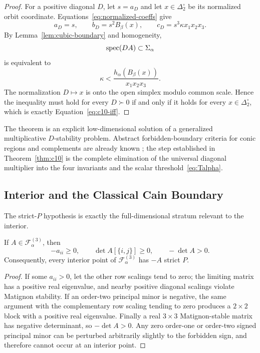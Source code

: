 \begin{proof}
For a positive diagonal \(D\), let \(s=a_D\) and let \(x\in\Delta_2^\circ\) be its normalized orbit coordinate. Equations~\eqref{eq:normalized-coeffs} give
\[
a_D=s,\qquad
b_D=s^2B_\beta(x),\qquad
c_D=s^3\kappa x_1x_2x_3.
\]
By Lemma~\ref{lem:cubic-boundary} and homogeneity,
\[
\operatorname{spec}(DA)\subset\Sigma_\alpha
\]
is equivalent to
\[
\kappa
<
\frac{h_\alpha(B_\beta(x))}{x_1x_2x_3}.
\]
The normalization \(D\mapsto x\) is onto the open simplex modulo common scale. Hence the inequality must hold for every \(D\succ0\) if and only if it holds for every \(x\in\Delta_2^\circ\), which is exactly Equation~\eqref{eq:c10-iff}.
\end{proof}

The theorem is an explicit low-dimensional solution of a generalized multiplicative \(D\)-stability problem. Abstract forbidden-boundary criteria for conic regions and complements are already known \cite{KushelPavaniJDDE}; the step established in Theorem~\ref{thm:c10} is the complete elimination of the universal diagonal multiplier into the four invariants and the scalar threshold~\eqref{eq:Talpha}.

\subsection{Interior and the Classical Cain Boundary}

The strict-\(P\) hypothesis is exactly the full-dimensional stratum relevant to the interior.

\begin{Lemma}\label{lem:P0}
If \(A\in\mathcal F_\alpha^{(3)}\), then
\[
-a_{ii}\ge0,\qquad
\det A[\{i,j\}]\ge0,\qquad
-\det A>0.
\]
Consequently, every interior point of \(\mathcal F_\alpha^{(3)}\) has \(-A\) strict \(P\).
\end{Lemma}

\begin{proof}
If some \(a_{ii}>0\), let the other row scalings tend to zero; the limiting matrix has a positive real eigenvalue, and nearby positive diagonal scalings violate Matignon stability. If an order-two principal minor is negative, the same argument with the complementary row scaling tending to zero produces a \(2\times2\) block with a positive real eigenvalue. Finally a real \(3\times3\) Matignon-stable matrix has negative determinant, so \(-\det A>0\). Any zero order-one or order-two signed principal minor can be perturbed arbitrarily slightly to the forbidden sign, and therefore cannot occur at an interior point.
\end{proof}

